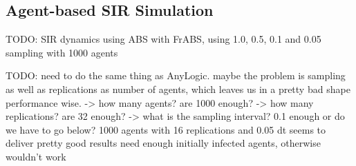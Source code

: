 \subsection{Agent-based SIR Simulation}
TODO: SIR dynamics using ABS with FrABS, using 1.0, 0.5, 0.1 and 0.05 sampling with 1000 agents

TODO: need to do the same thing as AnyLogic. maybe the problem is sampling as well as replications as number of agents, which leaves us in a pretty bad shape performance wise.
	-> how many agents? are 1000 enough?
	-> how many replications? are 32 enough?
	-> what is the sampling interval? 0.1 enough or do we have to go below?
	1000 agents with 16 replications and 0.05 dt seems to deliver pretty good results
	need enough initially infected agents, otherwise wouldn't work

